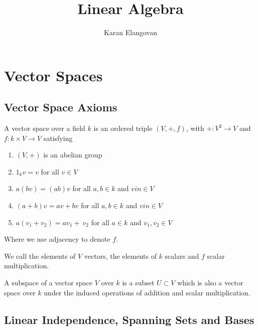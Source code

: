 \documentclass[]{article}
\title{Linear Algebra}
\author{Karan Elangovan}
\begin{document}
\maketitle

\doublespacing
\tableofcontents

\section{Vector Spaces}

\subsection{Vector Space Axioms}

\begin{defi} 
		A vector space over a field $k$ is an ordered triple $(V, +, f)$, with $+: V^2 \to V$ and $f: k \times V \to V$ satisfying 
		\begin{enumerate}
				\item $(V, +)$ is an abelian group
				\item $1_kv = v$ for all $v \in V$
				\item  $a (b v) = (a b) v$ for all $a, b \in k$ and $v in \in V$
				\item  $(a + b)v = a v + b v$ for all $a, b \in k$ and $v in \in V$
				\item $ a(v_1 + v_2) = a v_1 + \ v_2$ for all $a \in k$ and $v_1, v_2 \in V$
		\end{enumerate}
		Where we use adjacency to denote $f$.

		We call the elements of $V$ vectors, the elements of $k$ scalars and $f$ scalar multiplication.
\end{defi}

\begin{defi} [Subspace]
		A subspace of a vector space $V$ over $k$ is a subset $U \subset V$ which is also a vector space over $k$ under the induced operations of addition and scalar multiplication.
\end{defi}

\subsection{Linear Independence, Spanning Sets and Bases}
\end{document}

